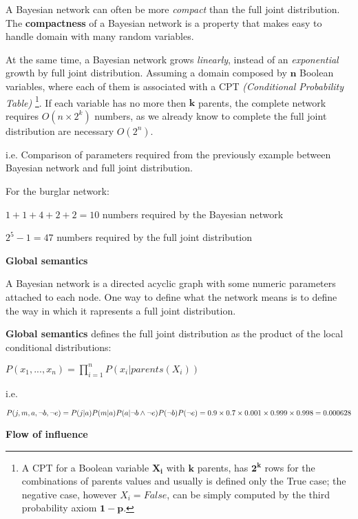 A Bayesian network can often be more \textit{compact} than the full joint distribution. The \textbf{compactness} of a Bayesian network is a property that makes easy to handle
domain with many random variables. \vspace{3.5pt}

At the same time, a Bayesian network grows \textit{linearly}, instead of an \textit{exponential} growth by full joint distribution. Assuming a domain composed by $\mathbf{n}$ Boolean
variables, where each of them is associated with a CPT \textit{(Conditional Probability Table)} \footnote{A CPT for a Boolean variable $\mathbf{X_i}$ with $\mathbf{k}$ parents, has $\mathbf{2^k}$
rows for the combinations of parents values and usually is defined only the True case; the negative case, however $X_i = False$, can be simply computed by the third probability axiom $\mathbf{1 - p}$.}.
If each variable has no more then $\mathbf{k}$ parents, the complete network requires $O(n \times 2^k)$ numbers, as we already know to complete the full joint distribution are necessary
$O(2^n)$.
\begin{example}
    i.e. Comparison of parameters required from the previously example between Bayesian network and full joint distribution. \vspace{3.5pt}

    For the burglar network: \vspace{3.5pt}

    $1 + 1 + 4 + 2 + 2 = 10$ numbers required by the Bayesian network \vspace{3.5pt}

    $2^5 - 1 = 47$ numbers required by the full joint distribution
\end{example}
\textbf{Global semantics} \vspace{3.5pt}

A Bayesian network is a directed acyclic graph with some numeric parameters attached to each node. One way to define what the network means is to define the way in which 
it rapresents a full joint distribution. 
\begin{definition}
    \textbf{Global semantics} defines the full joint distribution as the product of the local conditional distributions:
    \begin{center}
        $P(x_1, ..., x_n) = \prod_{i = 1}^{n} P(x_i|parents(X_i))$
    \end{center}
\end{definition}
\begin{example}
    i.e. 
    
    $P(j, m, a, \neg b, \neg e) \\
    = P(j|a)P(m|a)P(a|\neg b \wedge \neg e)P(\neg b)P(\neg e) \\
    = 0.9 \times 0.7 \times 0.001 \times 0.999 \times 0.998 = 0.000628$
\end{example}
\textbf{Flow of influence} \vspace{3.5pt}

